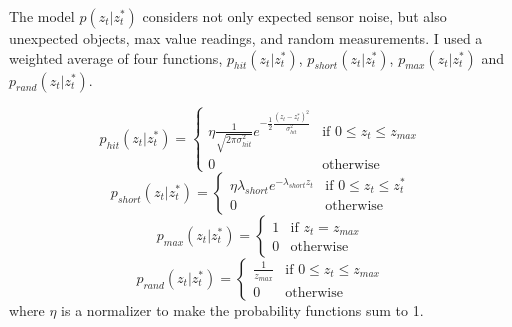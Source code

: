 \documentclass[11pt]{amsart}
\begin{document}
The model $p(z_t | z_t^*)$ considers not only expected sensor noise, but also unexpected objects, max value readings, and random measurements. I used a weighted average of four functions, $p_{hit}(z_t | z_t^*)$, $p_{short}(z_t | z_t^*)$, $p_{max}(z_t | z_t^*)$ and $p_{rand}(z_t | z_t^*)$.

\begin{displaymath}
   p_{hit}(z_t | z_t^*) = \left\{
     \begin{array}{lr}
       \eta \frac{1}{\sqrt{2\pi \sigma_{hit}^2}}e^{-\frac{1}{2}\frac{(z_t - z_t^*)^2}{\sigma_{hit}^2}} & \text{if } 0 \leq z_t \leq z_{max}\\
       0 & \text{otherwise}
     \end{array}
   \right.
\end{displaymath}
\begin{displaymath}
   p_{short}(z_t | z_t^*) = \left\{
     \begin{array}{lr}
       \eta \lambda_{short}e^{-\lambda_{short}z_t} & \text{if } 0 \leq z_t \leq z_t^*\\
       0 & \text{otherwise}
     \end{array}
   \right.
\end{displaymath}
\begin{displaymath}
   p_{max}(z_t | z_t^*) = \left\{
     \begin{array}{lr}
       1 & \text{if } z_t = z_{max}\\
       0 & \text{otherwise}
     \end{array}
   \right.
\end{displaymath}
\begin{displaymath}
   p_{rand}(z_t | z_t^*) = \left\{
     \begin{array}{lr}
       \frac{1}{z_{max}} & \text{if } 0 \leq z_t \leq z_{max}\\
       0 & \text{otherwise}
     \end{array}
   \right.
\end{displaymath}
where $\eta$ is a normalizer to make the probability functions sum to 1. 
\end{document}

